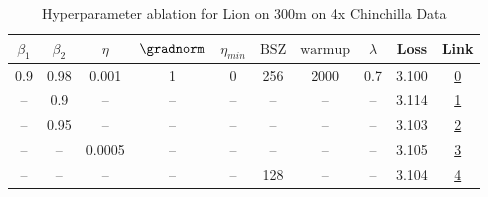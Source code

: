 \begin{table}[H]
\centering
\caption{Hyperparameter ablation for Lion on 300m on 4x Chinchilla Data}
\label{tab:ablation_lion_300m_on_4x_chinchilla_data}
\begin{tabular}{cccccccccc}
\toprule
$\beta_1$ & $\beta_2$ & $\eta$ & $\gradnorm$ & $\eta_{min}$ & $\mathrm{BSZ}$ & $\mathrm{warmup}$ & $\lambda$ & Loss & Link \\
\midrule
0.9 & 0.98 & 0.001 & 1 & 0 & 256 & 2000 & 0.7 & 3.100 & \href{https://wandb.ai/stanford-mercury/optimizer-scaling/runs/sweep-300m-24B-lion5aad2alr0.001-wd0.7-minlr0-warmup2000-b10.9-b-edb7fa}{0} \\
\midrule
-- & 0.9 & -- & -- & -- & -- & -- & -- & 3.114 & \href{https://wandb.ai/stanford-mercury/optimizer-scaling/runs/sweep-300m-24B-lionb554b6lr0.001-wd0.7-minlr0-warmup2000-b10.9-b-4d69db}{1} \\
-- & 0.95 & -- & -- & -- & -- & -- & -- & 3.103 & \href{https://wandb.ai/stanford-mercury/optimizer-scaling/runs/sweep-300m-24B-lion1d519dlr0.001-wd0.7-minlr0-warmup2000-b10.9-b-a24dd3}{2} \\
-- & -- & 0.0005 & -- & -- & -- & -- & -- & 3.105 & \href{https://wandb.ai/stanford-mercury/optimizer-scaling/runs/sweep-300m-24B-liond0e427lr0.0005-wd0.7-minlr0-warmup2000-b10.9--ab64aa}{3} \\
-- & -- & -- & -- & -- & 128 & -- & -- & 3.104 & \href{https://wandb.ai/stanford-mercury/optimizer-scaling/runs/sweep-300m-24B-lioneb1a25lr0.001-wd0.7-minlr0-warmup2000-b10.9-b-8b79ae}{4} \\
\bottomrule
\end{tabular}
\end{table}

